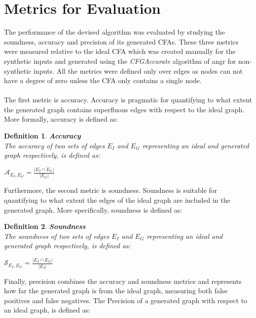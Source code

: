 \documentclass{kththesis}
\newtheorem*{definition}{Definition}
\newcommand{\fbcomment}[1]{{#1}}
\renewcommand{\fbcomment}[1]{}
\renewcommand{\it}[1]{\textit{#1}}
\begin{document}
\section{Metrics for Evaluation}\label{sec:metrics}
\fbcomment{\color{red}Goal: Introduce the metrics that will be used in the result chapter. Was put in the end of the method chapter since it is only relevant for the result chapter (The notions are introduced in the background chapter but not given formal definitions until now).}
The performance of the devised algorithm was evaluated by studying the soundness, accuracy and precision of its generated CFAs. These three metrics were measured relative to the ideal CFA which was created manually for the synthetic inputs and generated using the \it{CFGAccurate} algorithm of angr for non-synthetic inputs. All the metrics were defined only over edges as nodes can not have a degree of zero unless the CFA only contains a single node.
\\ \\
The first metric is accuracy. Accuracy is pragmatic for quantifying to what extent the generated graph contains superfluous edges with respect to the ideal graph. More formally, accuracy is defined as:
\begin{definition} \textbf{Accuracy}\\
The accuracy of two sets of edges $E_I$ and $E_G$ representing an ideal and generated graph respectively, is defined as:
\begin{center}
$\mathcal{A}_{E_I,E_G} = \frac{|E_I \cap E_G|}{|E_G|}$    
\end{center}
\end{definition}
\noindent
Furthermore, the second metric is soundness. Soundness is suitable for quantifying to what extent the edges of the ideal graph are included in the generated graph. More specifically, soundness is defined as:
\begin{definition} \textbf{Soundness}\\
The soundness of two sets of edges $E_I$ and $E_G$ representing an ideal and generated graph respectively, is defined as:
\begin{center}
$\mathcal{S}_{E_I,E_G} = \frac{|E_I \cap E_G|}{|E_I|}$    
\end{center}
\end{definition}
\noindent
Finally, precision combines the accuracy and soundness metrics and represents how far the generated graph is from the ideal graph, measuring both false positives and false negatives. The Precision of a generated graph with respect to an ideal graph, is defined as:
\end{document}
